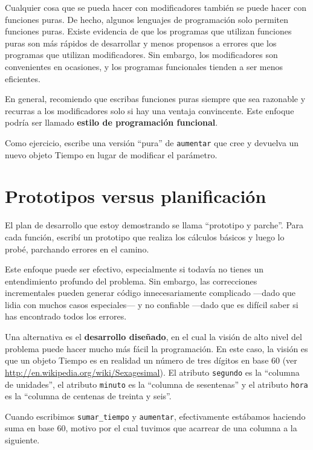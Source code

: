 \documentclass[10pt]{book}
\begin{document}
Cualquier cosa que se pueda hacer con modificadores también se puede hacer con funciones
puras.  De hecho, algunos lenguajes de programación solo permiten funciones
puras.  Existe evidencia de que los programas que utilizan funciones puras
son más rápidos de desarrollar y menos propensos a errores que los programas
que utilizan modificadores.  Sin embargo, los modificadores son convenientes en ocasiones,
y los programas funcionales tienden a ser menos eficientes.

En general, recomiendo que escribas funciones puras siempre que sea
razonable y recurras a los modificadores solo si hay una ventaja
convincente.  Este enfoque podría ser llamado {\bf estilo de
programación funcional}.

Como ejercicio, escribe una versión ``pura'' de {\tt aumentar} que
cree y devuelva un nuevo objeto Tiempo en lugar de modificar el
parámetro.


\section{Prototipos versus planificación}
\label{prototype}

El plan de desarrollo que estoy demostrando se llama ``prototipo y
parche''.  Para cada función, escribí un prototipo que realiza los
cálculos básicos y luego lo probé, parchando errores en el
camino.

Este enfoque puede ser efectivo, especialmente si todavía no tienes
un entendimiento profundo del problema.  Sin embargo, las correcciones incrementales pueden
generar código innecesariamente complicado ---dado que lidia con muchos
casos especiales--- y no confiable ---dado que es difícil saber si
has encontrado todos los errores.

Una alternativa es el {\bf desarrollo diseñado}, en el cual la visión
de alto nivel del problema puede hacer mucho más fácil la programación.  En
este caso, la visión es que un objeto Tiempo es en realidad un número
de tres dígitos en base 60 (ver \url{http://en.wikipedia.org/wiki/Sexagesimal}).  El
atributo {\tt segundo} es la ``columna de unidades'', el atributo {\tt minuto}
es la ``columna de sesentenas'' y el atributo {\tt hora} es
la ``columna de centenas de treinta y seis''.

Cuando escribimos \verb"sumar_tiempo" y {\tt aumentar}, efectivamente estábamos
haciendo suma en base 60, motivo por el cual tuvimos que acarrear de una
columna a la siguiente.
\end{document}
